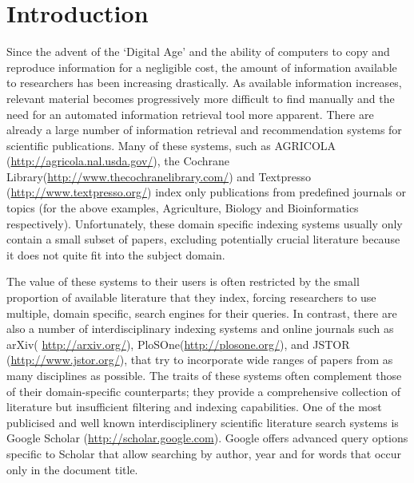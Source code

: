 \documentclass{svmult}
\begin{document}
\section{Introduction} \label{sec:1} Since the advent of the `Digital Age' and
the ability of computers to copy and reproduce information for a negligible
cost, the amount of information available to researchers has been increasing
drastically. As available information increases, relevant material becomes
progressively more difficult to find manually and the need for an automated
information retrieval tool more apparent.  There are already a large number of
information retrieval and recommendation systems for scientific publications.
Many of these systems, such as AGRICOLA (\url{http://agricola.nal.usda.gov/}),
the Cochrane Library(\url{http://www.thecochranelibrary.com/}) and Textpresso
(\url{http://www.textpresso.org/}) index only publications from predefined
journals or topics (for the above examples, Agriculture, Biology and
Bioinformatics respectively).  Unfortunately, these domain specific indexing
systems usually only contain a small subset of papers, excluding potentially
crucial literature because it does not quite fit into the subject domain. 

The value of these systems to their users is often restricted by the small
proportion of available literature that they index, forcing researchers to use
multiple, domain specific, search engines for their queries.  In contrast,
there are also a number of interdisciplinary indexing systems and online
journals such as arXiv( \url{http://arxiv.org/}),
PloSOne(\url{http://plosone.org/}), and JSTOR (\url{http://www.jstor.org/}),
that try to incorporate wide ranges of papers from as many disciplines as
possible. The traits of these systems often complement those of their
domain-specific counterparts; they provide a comprehensive collection of
literature but insufficient filtering and indexing capabilities.  One of the
most publicised and well known interdisciplinery scientific literature search
systems is Google Scholar (\url{http://scholar.google.com}). Google offers
advanced query options specific to Scholar that allow searching by author, year
and for words that occur only in the document title.
\end{document}
